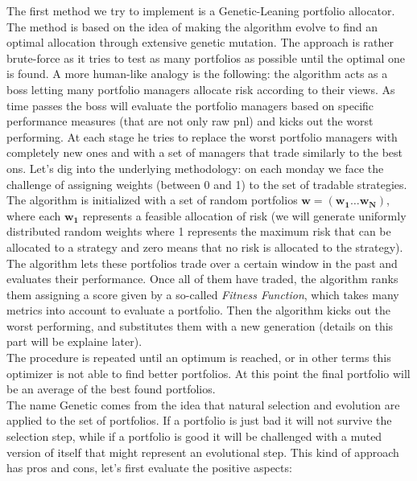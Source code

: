 The first method we try to implement is a Genetic-Leaning portfolio allocator. The method is based on the idea of making the algorithm evolve to find an optimal allocation through extensive genetic mutation.  The approach is rather brute-force as it tries to test as many portfolios as possible until the optimal one is found. A more human-like analogy is the following: the algorithm acts as a boss letting many portfolio managers allocate risk according to their views. As time passes the boss will evaluate the portfolio managers based on specific performance measures (that are not only raw pnl) and kicks out the worst performing. At each stage he tries to replace the worst portfolio managers with completely new ones and with a set of managers that trade similarly to the best ons. Let's dig into the underlying methodology: on each monday we face the challenge of assigning weights (between 0 and 1) to the set of tradable strategies. The algorithm is initialized  with a set of random portfolios $\mathbf{w} = (\mathbf{w_1} \dots \mathbf{w_N})$, where each $\mathbf{w_1}$ represents a feasible allocation of risk (we will generate uniformly distributed random weights where 1 represents the maximum risk that can be allocated to a strategy and zero means that no risk is allocated to the strategy). The algorithm lets these portfolios trade over a certain window in the past and evaluates their performance. Once all of them have traded, the algorithm ranks them assigning a score given by a so-called \textit{Fitness Function}, which takes many metrics into account to evaluate a portfolio. Then the algorithm kicks out the worst performing, and substitutes them with a new generation (details on this part will be explaine later).\\ The procedure is repeated until an optimum is reached, or in other terms this optimizer is not able to find better portfolios. At this point the final portfolio will be an average of the best found portfolios.\\
The name Genetic comes from the idea that natural selection and evolution are applied to the set of portfolios. If a portfolio is just bad it will not survive the selection step, while if a portfolio is good it will be challenged with a muted version of itself that might represent an evolutional step. This kind of approach has pros and cons, let's first evaluate the positive aspects:
